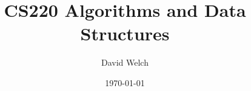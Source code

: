 \documentclass[11pt,oneside]{memoir}
\theoremstyle{definition}
\numberwithin{Lemma}{chapter}
\numberwithin{Exercise}{section}
\theoremstyle{remark}
\theoremstyle{boxampleStyle}
\begin{document}
   



\author{David Welch}
\title{CS220 Algorithms and Data Structures}
\date{\today}
\maketitle


\setcounter{page}{1}





{}

%
%
%
%


%
%
%

\renewcommand{\rm}{} %






%

%
\fi


%
%
%
% 
%


%
%
%
%
%



%

\printindex
\end{document}
